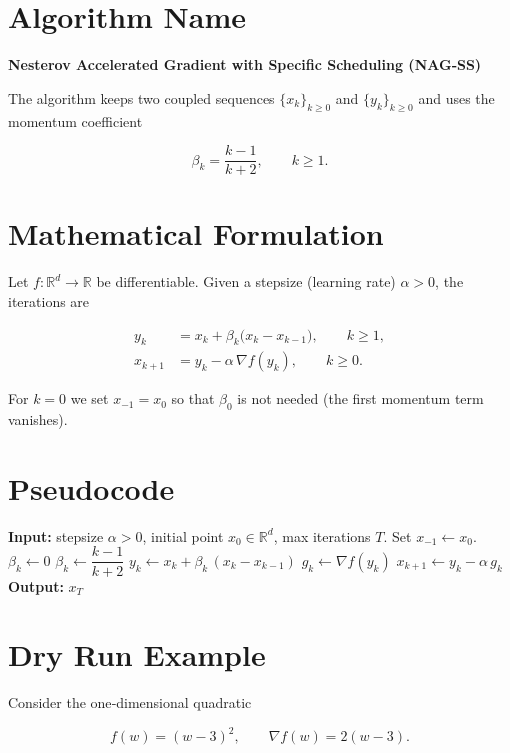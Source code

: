 \documentclass{article}
\newcommand{\grad}{\nabla}
\newcommand{\R}{\mathbb{R}}
\begin{document}
\section*{Algorithm Name}
\textbf{Nesterov Accelerated Gradient with Specific Scheduling (NAG‑SS)}  

The algorithm keeps two coupled sequences $\{x_k\}_{k\ge 0}$ and $\{y_k\}_{k\ge 0}$ and uses the momentum coefficient  

\[
\beta_k=\frac{k-1}{k+2},\qquad k\ge 1 .
\]

\section*{Mathematical Formulation}
Let $f:\R^d\rightarrow\R$ be differentiable.  
Given a stepsize (learning rate) $\alpha>0$, the iterations are  

\[
\boxed{
\begin{aligned}
y_k &= x_k+\beta_k\bigl(x_k-x_{k-1}\bigr), \qquad k\ge 1,\\[2mm]
x_{k+1} &= y_k-\alpha\,\grad f\!\left(y_k\right),\qquad k\ge 0 .
\end{aligned}}
\]

For $k=0$ we set $x_{-1}=x_0$ so that $\beta_0$ is not needed (the first momentum term vanishes).

\section*{Pseudocode}
\begin{algorithm}[H]
\caption{NAG‑SS}
\begin{algorithmic}[1]
\State \textbf{Input:} stepsize $\alpha>0$, initial point $x_0\in\R^d$, max iterations $T$.
\State Set $x_{-1}\gets x_0$.
        \State $\beta_k\gets 0$ 
    \Else
        \State $\beta_k\gets \dfrac{k-1}{k+2}$
    \EndIf
    \State $y_k \gets x_k + \beta_k\,(x_k-x_{k-1})$
    \State $g_k \gets \grad f(y_k)$
    \State $x_{k+1} \gets y_k - \alpha\, g_k$
\EndFor
\State \textbf{Output:} $x_T$
\end{algorithmic}
\end{algorithm}

\section*{Dry Run Example}
Consider the one‑dimensional quadratic  

\[
f(w)=(w-3)^2,\qquad \grad f(w)=2(w-3).
\]
\end{document}
